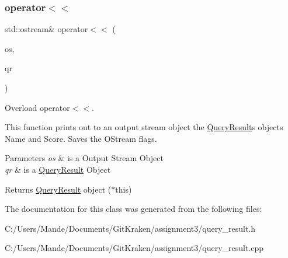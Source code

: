 \subsubsection{\texorpdfstring{operator$<$$<$}{operator<<}}
{\footnotesize\ttfamily std\+::ostream\& operator$<$$<$ (\begin{DoxyParamCaption}\item[{std\+::ostream \&}]{os,  }\item[{const \hyperlink{class_query_result}{Query\+Result} \&}]{qr }\end{DoxyParamCaption})\hspace{0.3cm}{\ttfamily [friend]}}



Overload operator$<$$<$. 

This function prints out to an output stream object the \hyperlink{class_query_result}{Query\+Result}\textquotesingle{}s objects Name and Score. Saves the O\+Stream flags.


\begin{DoxyParams}{Parameters}
{\em os} & is a Output Stream Object \\
\hline
{\em qr} & is a \hyperlink{class_query_result}{Query\+Result} Object \\
\hline
\end{DoxyParams}
\begin{DoxyReturn}{Returns}
\hyperlink{class_query_result}{Query\+Result} object ($\ast$this) 
\end{DoxyReturn}


The documentation for this class was generated from the following files\+:\begin{DoxyCompactItemize}
\item 
C\+:/\+Users/\+Mande/\+Documents/\+Git\+Kraken/assignment3/query\+\_\+result.\+h\item 
C\+:/\+Users/\+Mande/\+Documents/\+Git\+Kraken/assignment3/query\+\_\+result.\+cpp\end{DoxyCompactItemize}
